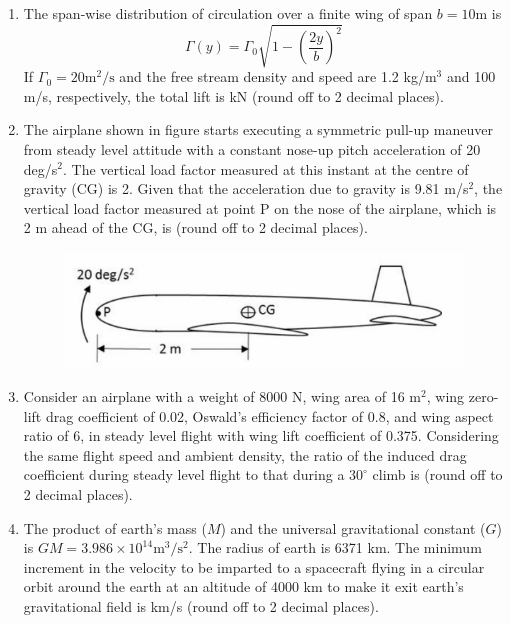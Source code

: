 \documentclass{article}
\begin{document}
\begin{enumerate}[leftmargin=*, resume]
\item The span-wise distribution of circulation over a finite wing of span \(b = 10  \text{m}\) is
\[
\Gamma(y) = \Gamma_0 \sqrt{1 - \left( \frac{2y}{b} \right)^2}
\]
If \(\Gamma_0 = 20  \text{m}^2/\text{s}\) and the free stream density and speed are 1.2 kg/m\(^3\) and 100 m/s, respectively, the total lift is \underline{\hspace{1.5cm}} kN (round off to 2 decimal places).

\item The airplane shown in figure starts executing a symmetric pull-up maneuver from steady level attitude with a constant nose-up pitch acceleration of 20 deg/s\(^2\). The vertical load factor measured at this instant at the centre of gravity (CG) is 2. Given that the acceleration due to gravity is 9.81 m/s\(^2\), the vertical load factor measured at point P on the nose of the airplane, which is 2 m ahead of the CG, is \underline{\hspace{1.5cm}} (round off to 2 decimal places).
\begin{figure}[H]
    \centering
    \includegraphics[width=0.4\linewidth]{figs/q47.png}
    \caption{}
    \label{fig:q47}
\end{figure}

\item Consider an airplane with a weight of 8000 N, wing area of 16 m\(^2\), wing zero-lift drag coefficient of 0.02, Oswald’s efficiency factor of 0.8, and wing aspect ratio of 6, in steady level flight with wing lift coefficient of 0.375. Considering the same flight speed and ambient density, the ratio of the induced drag coefficient during steady level flight to that during a \(30^\circ\) climb is \underline{\hspace{1.5cm}} (round off to 2 decimal places).

\item The product of earth’s mass (\(M\)) and the universal gravitational constant (\(G\)) is \(GM = 3.986 \times 10^{14}  \text{m}^3/\text{s}^2\). The radius of earth is 6371 km. The minimum increment in the velocity to be imparted to a spacecraft flying in a circular orbit around the earth at an altitude of 4000 km to make it exit earth’s gravitational field is \underline{\hspace{1.5cm}} km/s (round off to 2 decimal places).


\end{enumerate}
\end{document}
